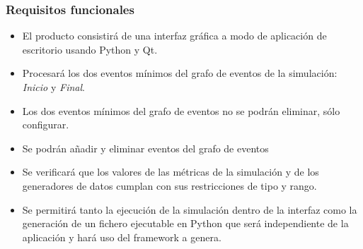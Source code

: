 \subsubsection{Requisitos funcionales}
\begin{itemize}
    \item El producto consistirá de una interfaz gráfica a modo de aplicación de escritorio usando Python y Qt.
    \item Procesará los dos eventos mínimos del grafo de eventos de la simulación: \emph{Inicio} y \emph{Final}.
    \item Los dos eventos mínimos del grafo de eventos no se podrán eliminar, sólo configurar.
    \item Se podrán añadir y eliminar eventos del grafo de eventos
    \item Se verificará que los valores de las métricas de la simulación y de los generadores de datos cumplan con sus restricciones de tipo y rango.
    \item Se permitirá tanto la ejecución de la simulación dentro de la interfaz como la
    generación de un fichero ejecutable en Python que será independiente de la
    aplicación y hará uso del framework a genera.
\end{itemize}
